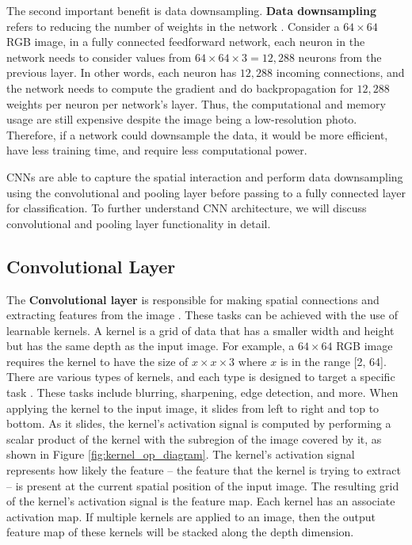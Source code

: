 The second important benefit is data downsampling. \textbf{Data downsampling} refers to reducing the number of weights in the network \cite{goodfellow_book}. Consider a $64 \times 64$ RGB image, in a fully connected feedforward network, each neuron in the network needs to consider values from $64 \times 64 \times 3 = 12,288$ neurons from the previous layer. In other words, each neuron has $12,288$ incoming connections, and the network needs to compute the gradient and do backpropagation for $12,288$ weights per neuron per network's layer. Thus, the computational and memory usage are still expensive despite the image being a low-resolution photo. Therefore, if a network could downsample the data, it would be more efficient, have less training time, and require less computational power.

CNNs are able to capture the spatial interaction and perform data downsampling using the convolutional and pooling layer before passing to a fully connected layer for classification. To further understand CNN architecture, we will discuss convolutional and pooling layer functionality in detail.

\subsection{Convolutional Layer}
The \textbf{Convolutional layer} is responsible for making spatial connections and extracting features from the image \cite{cnn_feature_extraction}. These tasks can be achieved with the use of learnable kernels. A kernel is a grid of data that has a smaller width and height but has the same depth as the input image. For example, a $64 \times 64$ RGB image requires the kernel to have the size of $x \times x \times 3$ where $x$ is in the range [2, 64]. There are various types of kernels, and each type is designed to target a specific task \cite{o2015introduction}. These tasks include blurring, sharpening, edge detection, and more. When applying the kernel to the input image, it slides from left to right and top to bottom. As it slides, the kernel's activation signal is computed by performing a scalar product of the kernel with the subregion of the image covered by it, as shown in Figure \ref{fig:kernel_op_diagram}. The kernel's activation signal represents how likely the feature -- the feature that the kernel is trying to extract -- is present at the current spatial position of the input image. The resulting grid of the kernel's activation signal is the feature map. Each kernel has an associate activation map. If multiple kernels are applied to an image, then the output feature map of these kernels will be stacked along the depth dimension.

